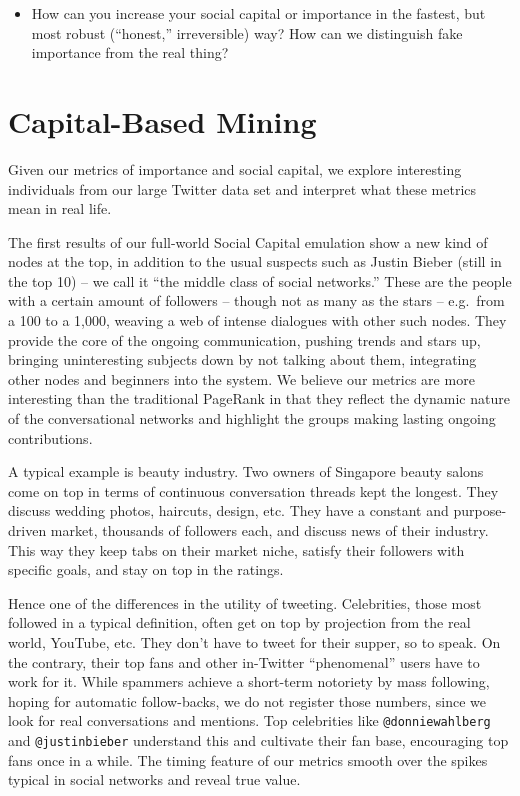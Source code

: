 \documentclass[10pt,oneside]{memoir}
\begin{document}
\begin{Spacing}{2}
\begin{itemize}
\item How can you increase your social capital or importance in the fastest, but most robust (``honest,'' irreversible) way? How can we distinguish fake importance from the real thing?



\end{itemize}

\pagebreak \section{Capital-Based Mining}
\label{capital-basedmining}

Given our metrics of importance and social capital, we explore interesting individuals from our large Twitter data set and interpret what these metrics mean in real life. 


The first results of our full-world Social Capital emulation show a new kind of nodes at the top, in addition to the usual suspects such as Justin Bieber (still in the top 10) -- we call it ``the middle class of social networks.'' These are the people with a certain amount of followers -- though not as many as the stars -- e.g.\ from a 100 to a 1,000, weaving a web of intense dialogues with other such nodes. They provide the core of the ongoing communication, pushing trends and stars up, bringing uninteresting subjects down by not talking about them, integrating other nodes and beginners into the system. We believe our metrics are more interesting than the traditional PageRank in that they reflect the dynamic nature of the conversational networks and highlight the groups making lasting ongoing contributions.


A typical example is beauty industry. Two owners of Singapore beauty salons come on top in terms of continuous conversation threads kept the longest. They discuss wedding photos, haircuts, design, etc. They have a constant and purpose-driven market, thousands of followers each, and discuss news of their industry. This way they keep tabs on their market niche, satisfy their followers with specific goals, and stay on top in the ratings.


Hence one of the differences in the utility of tweeting. Celebrities, those most followed in a typical definition, often get on top by projection from the real world, YouTube, etc. They don't have to tweet for their supper, so to speak. On the contrary, their top fans and other in-Twitter ``phenomenal'' users have to work for it. While spammers achieve a short-term notoriety by mass following, hoping for automatic follow-backs, we do not register those numbers, since we look for real conversations and mentions. Top celebrities like \texttt{@donniewahlberg} and \texttt{@justinbieber} understand this and cultivate their fan base, encouraging top fans once in a while. The timing feature of our metrics smooth over the spikes typical in social networks and reveal true value.



\end{Spacing}
\end{document}
